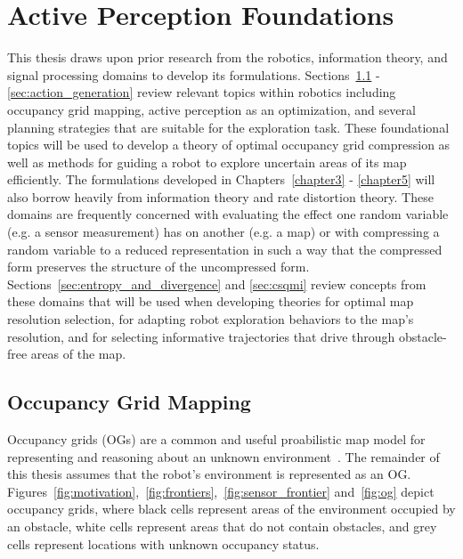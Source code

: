 \chapter{Active Perception Foundations}
\label{chapter2}

This thesis draws upon prior research from the robotics, information theory, and signal
processing domains to develop its formulations.
Sections~\ref{sec:occ_grid_mapping} - \ref{sec:action_generation} review relevant topics within
robotics including occupancy grid mapping,
active perception as an optimization, and several planning strategies that are suitable for the
exploration task. These foundational topics will be used to develop a theory of
optimal occupancy grid compression as well as methods for guiding a robot to explore
uncertain areas of its map efficiently. The formulations developed in
Chapters~\ref{chapter3} - \ref{chapter5} will also
borrow heavily from information theory and rate distortion theory. These
domains are frequently concerned with evaluating the effect one random
variable (e.g. a sensor measurement) has on
another (e.g. a map) or with compressing a random variable to a reduced
representation in such a way that the compressed form preserves the structure of the
uncompressed form.
Sections~\ref{sec:entropy_and_divergence} and \ref{sec:csqmi} review concepts from
these domains that will be used when developing theories for optimal map resolution selection,
for adapting robot exploration behaviors to the map's resolution, and for
selecting informative trajectories that drive through obstacle-free areas of the map.

\section{Occupancy Grid Mapping}
\label{sec:occ_grid_mapping}

Occupancy grids (OGs) are a common and useful proabilistic map model for representing and
reasoning about an unknown environment~\cite{elfes1989using}. The remainder of this thesis assumes that the robot's environment is represented as an OG.  Figures~\ref{fig:motivation},~\ref{fig:frontiers},~\ref{fig:sensor_frontier} and~\ref{fig:og} depict occupancy grids,
where black cells represent areas of the environment occupied by an obstacle, white cells
represent areas that do not contain obstacles, and grey cells represent
locations with unknown occupancy status.

